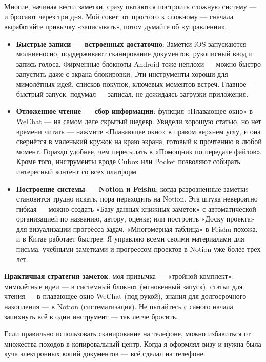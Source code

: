 
Многие, начиная вести заметки, сразу пытаются построить сложную систему — и бросают через три дня. Мой совет: от простого к сложному — сначала выработайте привычку «записывать», потом думайте об «управлении».

\begin{itemize}
  \item \textbf{Быстрые записи — встроенных достаточно}: Заметки iOS запускаются молниеносно, поддерживают сканирование документов, рукописный ввод и запись голоса. Фирменные блокноты Android тоже неплохи — можно быстро запустить даже с экрана блокировки. Эти инструменты хороши для мимолётных идей, списков покупок, ключевых моментов встреч. Главное — быстрый запуск: подумал — записал, не дожидаясь загрузки приложения.
  \item \textbf{Отложенное чтение — сбор информации}: функция «Плавающее окно» в WeChat — на самом деле скрытый шедевр. Увидели хорошую статью, но нет времени читать — нажмите «Плавающее окно» в правом верхнем углу, и она свернётся в маленький кружок на краю экрана, готовый к прочтению в любой момент. Гораздо удобнее, чем пересылать в «Помощник по передаче файлов». Кроме того, инструменты вроде Cubox или Pocket позволяют собирать интересный контент со всех платформ.
  \item \textbf{Построение системы — Notion и Feishu}: когда разрозненные заметки становится трудно искать, пора переходить на Notion. Эта штука невероятно гибкая — можно создать «Базу данных книжных заметок» с автоматической организацией по названию, автору, оценке; или построить «Доску проекта» для визуализации прогресса задач. «Многомерная таблица» в Feishu похожа, и в Китае работает быстрее. Я управляю всеми своими материалами для письма, учебными заметками и прогрессом проектов в Notion уже более трёх лет.
\end{itemize}

\textbf{Практичная стратегия заметок}: моя привычка — «тройной комплект»: мимолётные идеи — в системный блокнот (мгновенный запуск), статьи для чтения — в плавающее окно WeChat (под рукой), знания для долгосрочного накопления — в Notion (систематизация). Не пытайтесь с самого начала запихнуть всё в один инструмент — так легче бросить.


Если правильно использовать сканирование на телефоне, можно избавиться от множества походов в копировальный центр. Когда я оформлял визу и нужна была куча электронных копий документов — всё сделал на телефоне.

